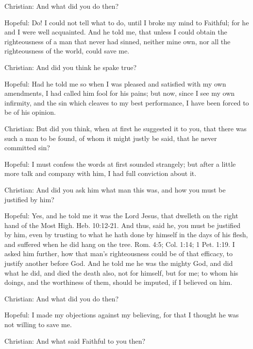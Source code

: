 Christian: And what did you do then?

Hopeful: Do! I could not tell what to do, until I broke my mind to Faithful; for he and I were well acquainted. And he told me, that unless I could obtain the righteousness of a man that never had sinned, neither mine own, nor all the righteousness of the world, could save me.

Christian: And did you think he spake true?

Hopeful: Had he told me so when I was pleased and satisfied with my own amendments, I had called him fool for his pains; but now, since I see my own infirmity, and the sin which cleaves to my best performance, I have been forced to be of his opinion.

Christian: But did you think, when at first he suggested it to you, that there was such a man to be found, of whom it might justly be said, that he never committed sin?

Hopeful: I must confess the words at first sounded strangely; but after a little more talk and company with him, I had full conviction about it.

Christian: And did you ask him what man this was, and how you must be justified by him?

Hopeful: Yes, and he told me it was the Lord Jesus, that dwelleth on the right hand of the Most High. Heb. 10:12-21. And thus, said he, you must be justified by him, even by trusting to what he hath done by himself in the days of his flesh, and suffered when he did hang on the tree. Rom. 4:5; Col. 1:14; 1 Pet. 1:19. I asked him further, how that man's righteousness could be of that efficacy, to justify another before God. And he told me he was the mighty God, and did what he did, and died the death also, not for himself, but for me; to whom his doings, and the worthiness of them, should be imputed, if I believed on him.

Christian: And what did you do then?

Hopeful: I made my objections against my believing, for that I thought he was not willing to save me.

Christian: And what said Faithful to you then?

